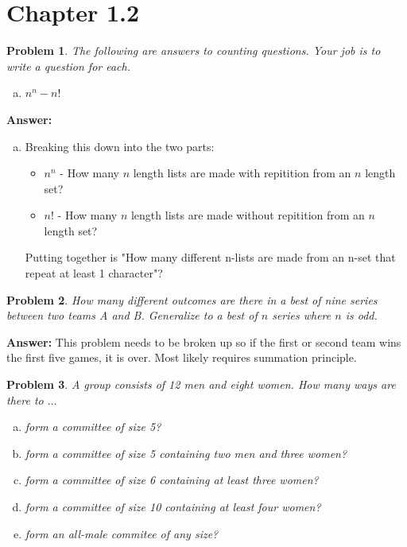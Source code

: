 \documentclass{article}
\theoremstyle{plain}
\newtheorem{problem}{Problem}
\begin{document}
\section{Chapter 1.2}
\begin{problem} %
The following are \textit{answers} to counting questions. Your job is to write a question for each.
\begin{enumerate}[(b)]
    \item $n^n - n!$
\end{enumerate}
\end{problem}

\textbf{Answer:}
\begin{enumerate}[(b)]
    \item Breaking this down into the two parts:
    \begin{itemize}
        \item $n^n$ - How many $n$ length lists are made with repitition from an $n$ length set?
        \item $n!$ - How many $n$ length lists are made without repitition from an $n$ length set?
    \end{itemize}
    Putting together is "How many different n-lists are made from an n-set that repeat at least 1 character"?
\end{enumerate}

\begin{problem} %
How many different outcomes are there in a best of nine series between two teams A and B. Generalize to a best of $n$ series where $n$ is odd.
\end{problem}

\textbf{Answer:}
This problem needs to be broken up so if the first or second team wins the first five games, it is over. Most likely requires summation principle.

\setcounter{problem}{3}
\begin{problem} %
A group consists of 12 men and eight women. How many ways are there to $\dots$
\begin{enumerate}[(a)]
\item form a committee of size 5?
\item form a committee of size 5 containing two men and three women?
\item form a committee of size 6 containing at least three women?
\item form a committee of size 10 containing at least four women?
\item form an all-male commitee of any size?
\end{enumerate}
\end{problem}
\end{document}
